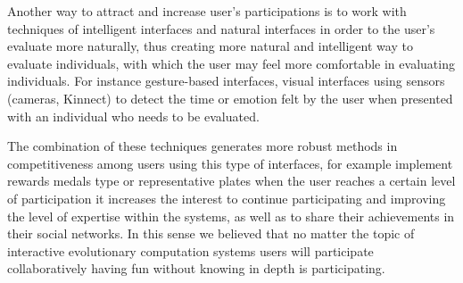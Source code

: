 Another way to attract and increase user’s participations is to work with
techniques of intelligent interfaces and natural interfaces in order to the
user's evaluate more naturally, thus creating more natural and intelligent way
to evaluate individuals, with which the user may feel more comfortable in
evaluating individuals. For instance  gesture-based interfaces, visual
interfaces using sensors (cameras, Kinnect) to detect the time or emotion felt
by the user when presented with an individual who needs to be evaluated.

The combination of these techniques generates more robust methods in
competitiveness among users using this type of  interfaces, for example
implement rewards medals type or representative plates when the user reaches a
certain level of participation it increases the interest to continue
participating and improving the level of expertise within the systems, as well
as to share their achievements in their social networks. In this sense we
believed that no matter the topic of interactive evolutionary computation
systems users will participate collaboratively having fun without knowing in
depth is participating.



